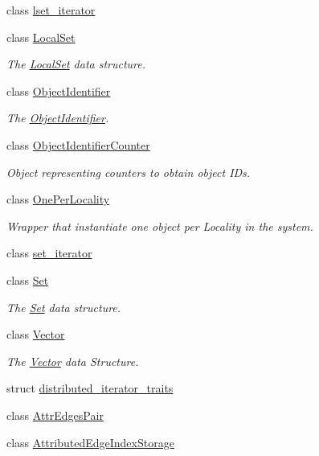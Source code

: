 \begin{DoxyCompactItemize}
class \hyperlink{classshad_1_1lset__iterator}{lset\-\_\-iterator}
\item 
class \hyperlink{classshad_1_1LocalSet}{Local\-Set}
\begin{DoxyCompactList}\small\item\em The \hyperlink{classshad_1_1LocalSet}{Local\-Set} data structure. \end{DoxyCompactList}\item 
class \hyperlink{classshad_1_1ObjectIdentifier}{Object\-Identifier}
\begin{DoxyCompactList}\small\item\em The \hyperlink{classshad_1_1ObjectIdentifier}{Object\-Identifier}. \end{DoxyCompactList}\item 
class \hyperlink{classshad_1_1ObjectIdentifierCounter}{Object\-Identifier\-Counter}
\begin{DoxyCompactList}\small\item\em Object representing counters to obtain object I\-Ds. \end{DoxyCompactList}\item 
class \hyperlink{classshad_1_1OnePerLocality}{One\-Per\-Locality}
\begin{DoxyCompactList}\small\item\em Wrapper that instantiate one object per Locality in the system. \end{DoxyCompactList}\item 
class \hyperlink{classshad_1_1set__iterator}{set\-\_\-iterator}
\item 
class \hyperlink{classshad_1_1Set}{Set}
\begin{DoxyCompactList}\small\item\em The \hyperlink{classshad_1_1Set}{Set} data structure. \end{DoxyCompactList}\item 
class \hyperlink{classshad_1_1Vector}{Vector}
\begin{DoxyCompactList}\small\item\em The \hyperlink{classshad_1_1Vector}{Vector} data Structure. \end{DoxyCompactList}\item 
struct \hyperlink{structshad_1_1distributed__iterator__traits}{distributed\-\_\-iterator\-\_\-traits}
\item 
class \hyperlink{classshad_1_1AttrEdgesPair}{Attr\-Edges\-Pair}
\item 
class \hyperlink{classshad_1_1AttributedEdgeIndexStorage}{Attributed\-Edge\-Index\-Storage}

\end{DoxyCompactItemize}
